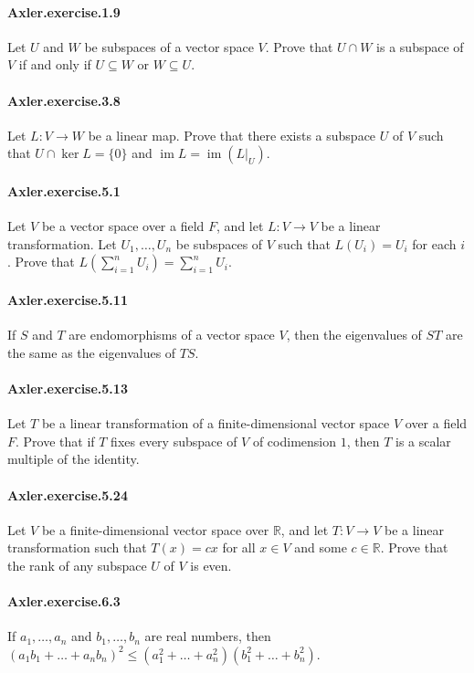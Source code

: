 \documentclass{article}
\begin{document}
\paragraph{Axler.exercise.1.9} Let $U$ and $W$ be subspaces of a vector space $V$. Prove that $U\cap W$ is a subspace of $V$ if and only if $U\subseteq W$ or $W\subseteq U$.

\paragraph{Axler.exercise.3.8} Let $L:V\to W$ be a linear map. Prove that there exists a subspace $U$ of $V$ such that $U\cap \ker L = \{0\}$ and $\operatorname{im} L = \operatorname{im} (L|_U)$.

\paragraph{Axler.exercise.5.1} Let $V$ be a vector space over a field $F$, and let $L:V\to V$ be a linear transformation. Let $U_1, \dots, U_n$ be subspaces of $V$ such that $L(U_i)=U_i$ for each $i$. Prove that $L(\sum_{i=1}^n U_i)=\sum_{i=1}^n U_i$.

\paragraph{Axler.exercise.5.11} If $S$ and $T$ are endomorphisms of a vector space $V$, then the eigenvalues of $ST$ are the same as the eigenvalues of $TS$.

\paragraph{Axler.exercise.5.13} Let $T$ be a linear transformation of a finite-dimensional vector space $V$ over a field $F$. Prove that if $T$ fixes every subspace of $V$ of codimension $1$, then $T$ is a scalar multiple of the identity.

\paragraph{Axler.exercise.5.24} Let $V$ be a finite-dimensional vector space over $\mathbb{R}$, and let $T:V\to V$ be a linear transformation such that $T(x)=cx$ for all $x\in V$ and some $c\in\mathbb{R}$. Prove that the rank of any subspace $U$ of $V$ is even.

\paragraph{Axler.exercise.6.3} If $a_1, \dots, a_n$ and $b_1, \dots, b_n$ are real numbers, then $(a_1b_1 + \dots + a_nb_n)^2 \leq (a_1^2 + \dots + a_n^2)(b_1^2 + \dots + b_n^2)$.
\end{document}
